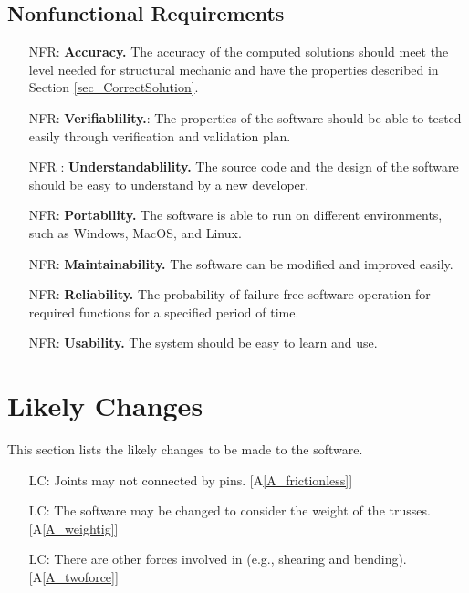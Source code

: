 \documentclass[12pt]{article}
\newcommand{\aref}[1]{A\ref{#1}}
\newcounter{reqnum} %
\newcounter{nonreqnum} %
\newcounter{lcnum} %
\begin{document}
\subsection{Nonfunctional Requirements}

\noindent 

\begin{itemize}
\item [NFR\refstepcounter{nonreqnum}\thenonreqnum \label{NFR_Accuracy}:] 
\textbf{Accuracy.} The accuracy of the computed solutions should meet the level 
needed 
for structural mechanic and have the properties described in Section 
\ref{sec_CorrectSolution}.
\item [NFR\refstepcounter{nonreqnum}\thenonreqnum \label{NFR_Verifiability}:]
\textbf{Verifiablility.}: The properties of the software should be able to 
tested easily through verification and validation plan.
\item [NFR\refstepcounter{nonreqnum}\thenonreqnum 
\label{NFR_Understandability}:]
\textbf{Understandablility.} The source code and the design of the software 
should be easy to understand by a new developer.
\item [NFR\refstepcounter{nonreqnum}\thenonreqnum \label{NFR_Portability}:] 
\textbf{Portability.} The software is able to run on different environments, 
such as Windows, MacOS, and Linux.
\item [NFR\refstepcounter{nonreqnum}\thenonreqnum \label{NFR_Maintainability}:]
\textbf{Maintainability.} The software can be modified and improved easily.
\item [NFR\refstepcounter{nonreqnum}\thenonreqnum \label{NFR_Reliability}:]  
\textbf{Reliability.} The probability of failure-free software operation 
for required functions for a specified period of time.
\item [NFR\refstepcounter{nonreqnum}\thenonreqnum \label{NFR_Usability}:] 
\textbf{Usability.} The system should be easy to learn and use.

\end{itemize}

\section{Likely Changes}    
This section lists the likely changes to be made to the software.
\noindent \begin{itemize}

\item[LC\refstepcounter{lcnum}\thelcnum\label{LC_notpinconnect}:] Joints may 
not connected by pins. [\aref{A_frictionless}]

\item[LC\refstepcounter{lcnum}\thelcnum\label{LC_weightinclude}:] The 
software may be changed to consider the weight of the trusses.
[\aref{A_weightig}]

\item[LC\refstepcounter{lcnum}\thelcnum\label{LC_otherforce}:] There are other 
forces involved in (e.g., shearing and bending). [\aref{A_twoforce}]

\end{itemize}
\end{document}
